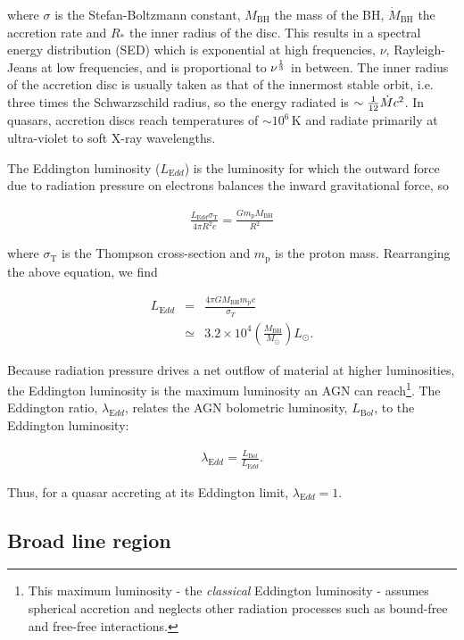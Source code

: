 \noindent where $\sigma$ is the Stefan-Boltzmann constant, $M_{\text{BH}}$ the mass of the BH, $\dot M_{\text{BH}}$ the accretion rate and $R_*$ the inner radius of the disc.
This results in a spectral energy distribution (SED) which is exponential at high frequencies, $\nu$, Rayleigh-Jeans at low frequencies, and is proportional to $\nu^{1\over 3}$ in between.
The inner radius of the accretion disc is usually taken as that of the innermost stable orbit, i.e. three times the Schwarzschild radius, so the energy radiated is $\sim {1\over12}\dot M c^2$.
In quasars, accretion discs reach temperatures of $\sim10^6$\,K and radiate primarily at ultra-violet to soft X-ray wavelengths.

The Eddington luminosity ($L_{\mathrm Edd}$) is the luminosity for which the outward force due to radiation pressure on electrons balances the inward gravitational force, so

\begin{eqnarray}
\frac{L_{\mathrm Edd}\sigma_{\mathrm T}}{4\pi R^2 c} = \frac{G m_{\text{p}} M_{\text{BH}}}{R^2}
\end{eqnarray}

\noindent where $\sigma_{\mathrm T}$ is the Thompson cross-section and $m_{\text{p}}$ is the proton mass.
Rearranging the above equation, we find

\begin{eqnarray}
L_{\mathrm Edd} &=& \frac{4 \pi G M_{\text{BH}} m_{\text{p}} c}{\sigma_T} \\
&\simeq&3.2\times10^4\left(\frac{M_{\text{BH}}}{M_\odot}\right)L_\odot.
\end{eqnarray}

Because radiation pressure drives a net outflow of material at higher luminosities, the Eddington luminosity is the maximum luminosity an AGN can reach\footnote{This maximum luminosity - the {\em classical} Eddington luminosity - assumes spherical accretion and neglects other radiation processes such as bound-free and free-free interactions.}.
The Eddington ratio, $\lambda_{\mathrm Edd}$, relates the AGN bolometric luminosity, $L_{\mathrm Bol}$, to the Eddington luminosity:

\begin{eqnarray}
\lambda_{\mathrm Edd} = \frac {L_{\mathrm Bol}} {L_{\mathrm Edd}}.
\end{eqnarray}

Thus, for a quasar accreting at its Eddington limit, $\lambda_{\mathrm Edd} = 1$.

\subsection{Broad line region}

